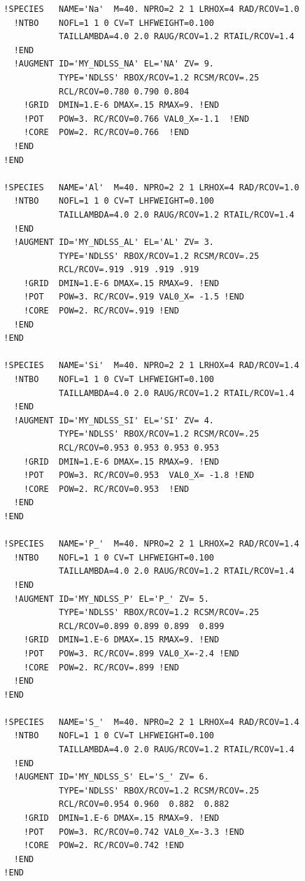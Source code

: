 \documentclass[11pt,a4paper]{report}
\begin{document}
\begin{verbatim}
  !SPECIES   NAME='Na'  M=40. NPRO=2 2 1 LRHOX=4 RAD/RCOV=1.0
    !NTBO    NOFL=1 1 0 CV=T LHFWEIGHT=0.100
             TAILLAMBDA=4.0 2.0 RAUG/RCOV=1.2 RTAIL/RCOV=1.4 
    !END 
    !AUGMENT ID='MY_NDLSS_NA' EL='NA' ZV= 9.
             TYPE='NDLSS' RBOX/RCOV=1.2 RCSM/RCOV=.25
             RCL/RCOV=0.780 0.790 0.804
      !GRID  DMIN=1.E-6 DMAX=.15 RMAX=9. !END
      !POT   POW=3. RC/RCOV=0.766 VAL0_X=-1.1  !END
      !CORE  POW=2. RC/RCOV=0.766  !END
    !END
  !END

  !SPECIES   NAME='Al'  M=40. NPRO=2 2 1 LRHOX=4 RAD/RCOV=1.0
    !NTBO    NOFL=1 1 0 CV=T LHFWEIGHT=0.100
             TAILLAMBDA=4.0 2.0 RAUG/RCOV=1.2 RTAIL/RCOV=1.4 
    !END 
    !AUGMENT ID='MY_NDLSS_AL' EL='AL' ZV= 3.
             TYPE='NDLSS' RBOX/RCOV=1.2 RCSM/RCOV=.25
             RCL/RCOV=.919 .919 .919 .919
      !GRID  DMIN=1.E-6 DMAX=.15 RMAX=9. !END
      !POT   POW=3. RC/RCOV=.919 VAL0_X= -1.5 !END
      !CORE  POW=2. RC/RCOV=.919 !END
    !END
  !END

  !SPECIES   NAME='Si'  M=40. NPRO=2 2 1 LRHOX=4 RAD/RCOV=1.4
    !NTBO    NOFL=1 1 0 CV=T LHFWEIGHT=0.100
             TAILLAMBDA=4.0 2.0 RAUG/RCOV=1.2 RTAIL/RCOV=1.4 
    !END 
    !AUGMENT ID='MY_NDLSS_SI' EL='SI' ZV= 4.
             TYPE='NDLSS' RBOX/RCOV=1.2 RCSM/RCOV=.25
             RCL/RCOV=0.953 0.953 0.953 0.953 
      !GRID  DMIN=1.E-6 DMAX=.15 RMAX=9. !END
      !POT   POW=3. RC/RCOV=0.953  VAL0_X= -1.8 !END
      !CORE  POW=2. RC/RCOV=0.953  !END
    !END
  !END

  !SPECIES   NAME='P_'  M=40. NPRO=2 2 1 LRHOX=2 RAD/RCOV=1.4
    !NTBO    NOFL=1 1 0 CV=T LHFWEIGHT=0.100
             TAILLAMBDA=4.0 2.0 RAUG/RCOV=1.2 RTAIL/RCOV=1.4 
    !END 
    !AUGMENT ID='MY_NDLSS_P' EL='P_' ZV= 5.
             TYPE='NDLSS' RBOX/RCOV=1.2 RCSM/RCOV=.25
             RCL/RCOV=0.899 0.899 0.899  0.899 
      !GRID  DMIN=1.E-6 DMAX=.15 RMAX=9. !END
      !POT   POW=3. RC/RCOV=.899 VAL0_X=-2.4 !END
      !CORE  POW=2. RC/RCOV=.899 !END
    !END
  !END

  !SPECIES   NAME='S_'  M=40. NPRO=2 2 1 LRHOX=4 RAD/RCOV=1.4
    !NTBO    NOFL=1 1 0 CV=T LHFWEIGHT=0.100
             TAILLAMBDA=4.0 2.0 RAUG/RCOV=1.2 RTAIL/RCOV=1.4 
    !END 
    !AUGMENT ID='MY_NDLSS_S' EL='S_' ZV= 6.
             TYPE='NDLSS' RBOX/RCOV=1.2 RCSM/RCOV=.25
             RCL/RCOV=0.954 0.960  0.882  0.882
      !GRID  DMIN=1.E-6 DMAX=.15 RMAX=9. !END
      !POT   POW=3. RC/RCOV=0.742 VAL0_X=-3.3 !END
      !CORE  POW=2. RC/RCOV=0.742 !END
    !END
  !END


\end{verbatim}
\end{document}
